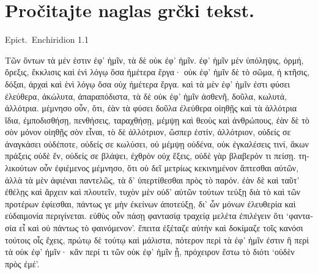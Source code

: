 \section*{Pročitajte naglas grčki tekst.}

Epict.\ Enchiridion 1.1


\medskip

\begin{greek}
{\large
{ \noindent Τῶν ὄντων τὰ μέν ἐστιν ἐφ' ἡμῖν, τὰ δὲ οὐκ ἐφ' ἡμῖν. ἐφ' ἡμῖν μὲν ὑπόληψις, ὁρμή, ὄρεξις, ἔκκλισις καὶ ἑνὶ λόγῳ ὅσα ἡμέτερα ἔργα· οὐκ ἐφ' ἡμῖν δὲ τὸ σῶμα, ἡ κτῆσις, δόξαι, ἀρχαὶ καὶ ἑνὶ λόγῳ ὅσα οὐχ ἡμέτερα ἔργα. καὶ τὰ μὲν ἐφ' ἡμῖν ἐστι φύσει ἐλεύθερα, ἀκώλυτα, ἀπαραπόδιστα, τὰ δὲ οὐκ ἐφ' ἡμῖν ἀσθενῆ, δοῦλα, κωλυτά, ἀλλότρια. μέμνησο οὖν, ὅτι, ἐὰν τὰ φύσει δοῦλα ἐλεύθερα οἰηθῇς καὶ τὰ ἀλλότρια ἴδια, ἐμποδισθήσῃ, πενθήσεις, ταραχθήσῃ, μέμψῃ καὶ θεοὺς καὶ ἀνθρώπους, ἐὰν δὲ τὸ σὸν μόνον οἰηθῇς σὸν εἶναι, τὸ δὲ ἀλλότριον, ὥσπερ ἐστίν, ἀλλότριον, οὐδείς σε ἀναγκάσει οὐδέποτε, οὐδείς σε κωλύσει, οὐ μέμψῃ οὐδένα, οὐκ ἐγκαλέσεις τινί, ἄκων πράξεις οὐδὲ ἕν, οὐδείς σε βλάψει, ἐχθρὸν οὐχ ἕξεις, οὐδὲ γὰρ βλαβερόν τι πείσῃ. τηλικούτων οὖν ἐφιέμενος μέμνησο, ὅτι οὐ δεῖ μετρίως  κεκινημένον ἅπτεσθαι αὐτῶν, ἀλλὰ τὰ μὲν ἀφιέναι παντελῶς, τὰ δ' ὑπερτίθεσθαι πρὸς τὸ παρόν. ἐὰν δὲ καὶ ταῦτ' ἐθέλῃς καὶ ἄρχειν καὶ πλουτεῖν, τυχὸν μὲν οὐδ' αὐτῶν τούτων τεύξῃ διὰ τὸ καὶ τῶν προτέρων ἐφίεσθαι, πάντως γε μὴν ἐκείνων ἀποτεύξῃ, δι' ὧν μόνων ἐλευθερία καὶ εὐδαιμονία περιγίνεται. εὐθὺς οὖν πάσῃ φαντασίᾳ τραχείᾳ μελέτα ἐπιλέγειν ὅτι ‘φαντασία εἶ καὶ οὐ πάντως τὸ φαινόμενον’. ἔπειτα ἐξέταζε αὐτὴν καὶ δοκίμαζε τοῖς κανόσι τούτοις οἷς ἔχεις, πρώτῳ δὲ τούτῳ καὶ μάλιστα, πότερον περὶ τὰ ἐφ' ἡμῖν ἐστιν ἢ περὶ τὰ οὐκ ἐφ' ἡμῖν· κἂν περί τι τῶν οὐκ ἐφ' ἡμῖν ᾖ, πρόχειρον ἔστω τὸ διότι ‘οὐδὲν πρὸς ἐμέ’.

}
}
\end{greek}

